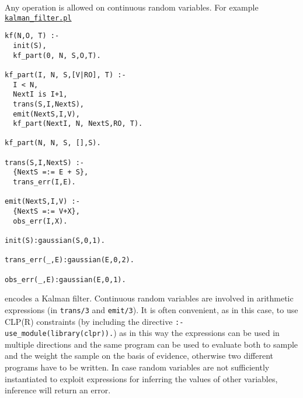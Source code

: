 Any operation is allowed on continuous random variables. For example
\href{http://cplint.lamping.unife.it/example/inference/kalman_filter.pl}{\texttt{kalman\_filter.pl}}
\begin{verbatim}
kf(N,O, T) :-
  init(S),
  kf_part(0, N, S,O,T).

kf_part(I, N, S,[V|RO], T) :-
  I < N,
  NextI is I+1,
  trans(S,I,NextS),
  emit(NextS,I,V),
  kf_part(NextI, N, NextS,RO, T).

kf_part(N, N, S, [],S).

trans(S,I,NextS) :-
  {NextS =:= E + S},
  trans_err(I,E).

emit(NextS,I,V) :-
  {NextS =:= V+X},
  obs_err(I,X).

init(S):gaussian(S,0,1).

trans_err(_,E):gaussian(E,0,2).

obs_err(_,E):gaussian(E,0,1).
\end{verbatim}
encodes a Kalman filter. Continuous random variables are involved
in arithmetic expressions (in \verb|trans/3| and \verb|emit/3|). It
is often convenient, as in this case, to use CLP(R) constraints (by
including the directive \verb|:- use_module(library(clpr)).|) as 
in this way the expressions can be used in multiple directions and 
the same program can be used to evaluate both to sample and the weight the sample on the basis
of evidence,
otherwise two different programs have to be written.
In case random variables are not sufficiently instantiated to 
exploit expressions for inferring the values of other variables, 
inference will return an error.

